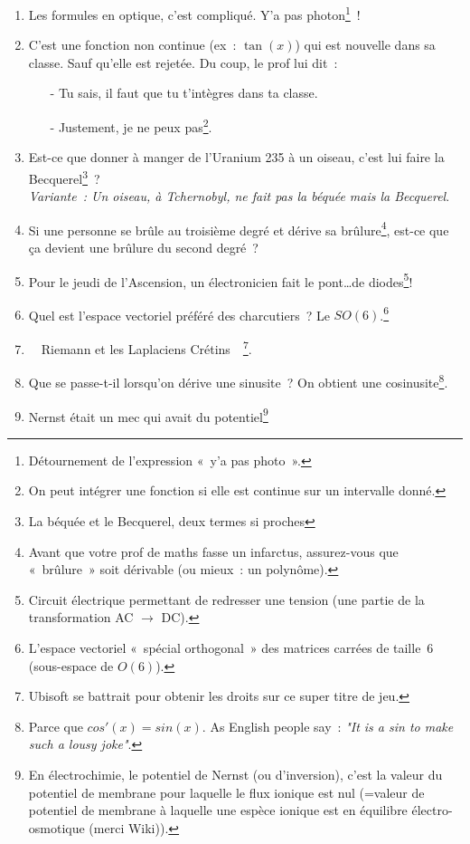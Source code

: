 \documentclass[10pt,a5paper,fullpage]{book}
\begin{document}
\begin{enumerate}
		\item Les formules en optique, c’est compliqué. Y’a pas photon\footnote{Détournement de l’expression « y’a pas photo ».}~!
		\item C’est une fonction non continue (ex~: $\tan(x)$) qui est nouvelle dans sa classe. Sauf qu’elle est rejetée. Du coup, le prof lui dit~: 
		\begin{itemize}
			\item[-] Tu sais, il faut que tu t’intègres dans ta classe.
			\item[-] Justement, je ne peux pas\footnote{On peut intégrer une fonction si elle est continue sur un intervalle donné.}.
		\end{itemize}
		\item Est-ce que donner à manger de l’Uranium 235 à un oiseau, c’est lui faire la Becquerel\footnote{La béquée et le Becquerel, deux termes si proches}~? \\\textit{Variante~: Un oiseau, à Tchernobyl, ne fait pas la béquée mais la Becquerel}.
		\item Si une personne se brûle au troisième degré et dérive sa brûlure\footnote{Avant que votre prof de maths fasse un infarctus, assurez-vous que « brûlure » soit dérivable (ou mieux~: un polynôme).}, est-ce que ça devient une brûlure du second degré~?
		\item  Pour le jeudi de l’Ascension, un électronicien fait le pont\ldots de diodes\footnote{Circuit électrique permettant de redresser une tension (une partie de la transformation AC $\rightarrow$ DC).}!
		\item Quel est l’espace vectoriel préféré des charcutiers~? Le $SO(6)$.\footnote{L’espace vectoriel « spécial orthogonal » des matrices carrées de taille~6 (sous-espace de $O(6)$).}
		\item \guillemotleft~ Riemann et les Laplaciens Crétins ~\guillemotright\footnote{Ubisoft se battrait pour obtenir les droits sur ce super titre de jeu.}.
		\item Que se passe-t-il lorsqu’on dérive une sinusite~? On obtient une cosinusite\footnote{Parce que $cos'(x) = sin(x)$. As English people say~: \textit{"It is a sin to make such a lousy joke"}.}.
		\item Nernst était un mec qui avait du potentiel\footnote{En électrochimie, le potentiel de Nernst (ou d'inversion), c'est la valeur du potentiel de membrane pour laquelle le flux ionique est nul (=valeur de potentiel de membrane à laquelle une espèce ionique est en équilibre électro-osmotique (merci Wiki)).}

\end{enumerate}
\end{document}
